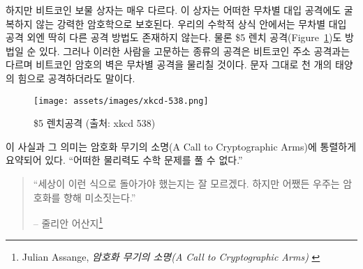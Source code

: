 \begin{comment}
	Bitcoin's treasure chest is very different. It is secured by strong
	cryptography, which does not give way to brute force. And as long as the
	underlying mathematical assumptions hold, brute force is all we have.
	Granted, there is also the option of a global \$5 wrench attack (Figure~\ref{fig:xkcd-538})
	But torture won't work for all bitcoin addresses, and the cryptographic
	walls of bitcoin will defeat brute force attacks. Even if you come at it
	with the force of a thousand suns. Literally.
\end{comment}
하지만 비트코인 보물 상자는 매우 다르다. 
이 상자는 어떠한 무차별 대입 공격에도 굴복하지 않는 강력한 암호학으로 보호된다. 
우리의 수학적 상식 안에서는 무차별 대입 공격 외엔 딱히 다른 공격 방법도 존재하지 않는다. 
물론 \$5 렌치 공격(Figure~\ref{fig:xkcd-538})도 방법일 순 있다. 
그러나 이러한 사람을 고문하는 종류의 공격은 비트코인 주소 공격과는 다르며 비트코인 암호의 벽은 무차별 공격을 물리칠 것이다. 
문자 그대로 천 개의 태양의 힘으로 공격하더라도 말이다. 

\begin{figure}
	\centering
	\texttt{[image: assets/images/xkcd-538.png]}
	\caption{\$5 렌치공격 (출처: xkcd 538)}
	\label{fig:xkcd-538}
\end{figure}

\begin{comment}
	This fact and its implications were poignantly summarized in the call
	to cryptographic arms: \textit{\enquote{No amount of coercive force will ever solve
	a math problem.}
\end{comment}
이 사실과 그 의미는 암호화 무기의 소명(A Call to Cryptographic Arms)에 통렬하게 요약되어 있다.
\enquote{어떠한 물리력도 수학 문제를 풀 수 없다.}

\begin{comment}
	\begin{quotation}\begin{samepage}
			\enquote{It isn't obvious that the world had to work this way. But somehow the
				universe smiles on encryption.}
			\begin{flushright} -- Julian Assange\footnote{Julian Assange, \textit{A Call to Cryptographic Arms} \cite{call-to-cryptographic-arms}}
	\end{flushright}\end{samepage}\end{quotation}
\end{comment}
\begin{quotation}\begin{samepage}
		\enquote{세상이 이런 식으로 돌아가야 했는지는 잘 모르겠다. 하지만 어쨌든 우주는 암호화를 향해 미소짓는다.}
		\begin{flushright} -- 줄리안 어산지\footnote{Julian Assange, \textit{암호화 무기의 소명(A Call to Cryptographic Arms)} \cite{call-to-cryptographic-arms}}
\end{flushright}\end{samepage}\end{quotation}

